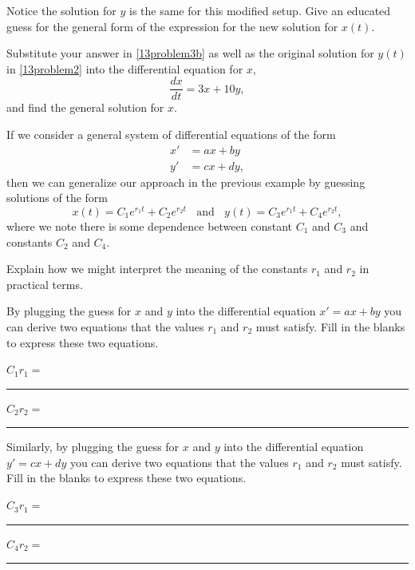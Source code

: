 \ii Notice the solution for $y$ is the same for this modified setup. Give an educated guess for the general form of the expression for the new solution for $x(t)$.\label{13problem3b}

\vspace{1in}

\ii Substitute your answer in \ref{13problem3b} as well as the original solution for $y(t)$ in \ref{13problem2} into the differential equation for $x$,
\[ \frac{dx}{dt} = 3x+10y,\]
and find the general solution for $x$.\label{13problem3c}

\ee
\ee

\clearpage


If we consider a general system of differential equations of the form
\begin{align*}
x' &= ax+by \\
y' &= cx+dy,
\end{align*}
then we can generalize our approach in the previous example by guessing solutions of the form
\[ x(t) = C_1 e^{r_1t} + C_2 e^{r_2t} \ \ \ \ \mbox{and} \ \ \ \ y(t) = C_3e^{r_1t} + C_4 e^{r_2t}, \]
where we note there is some dependence between constant $C_1$ and $C_3$ and constants $C_2$ and $C_4$. 

\bb[resume]
\ii Explain how we might interpret the meaning of the constants $r_1$ and $r_2$ in practical terms.\label{13problem4}

\vspace{1in}

\ii By plugging the guess for $x$ and $y$ into the differential equation $x'= ax+by$ you can derive two equations that the values $r_1$ and $r_2$ must satisfy. Fill in the blanks to express these two equations.\label{13problem5}

\vfill

\noindent $C_1r_1 = $ \rule{0.25\tw}{0.5pt} \hspace{0.5in}  $C_2r_2 = $ \rule{0.25\tw}{0.5pt}

\ii Similarly, by plugging the guess for $x$ and $y$ into the differential equation $y'= cx+dy$ you can derive two equations that the values $r_1$ and $r_2$ must satisfy. Fill in the blanks to express these two equations.\label{13problem6}

\vfill

\noindent $C_3r_1 = $ \rule{0.25\tw}{0.5pt} \hspace{0.5in}  $C_4r_2 = $ \rule{0.25\tw}{0.5pt}

